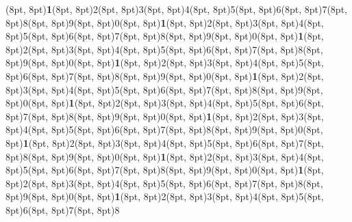 \documentclass[10,a4paper]{article}
\newcommand{\highlight}[1]{{\color{red}\textbf{1}}}
\begin{document}
{{\begin{minipage}{12in}
\vspace{0.7\baselineskip}

\fontsize{8}{8}\selectfont

\framebox(8pt, 8pt){\highlight{1}}\framebox(8pt,
8pt){2}\framebox(8pt, 8pt){3}\framebox(8pt,
8pt){4}\framebox(8pt, 8pt){5}\framebox(8pt,
8pt){6}\framebox(8pt, 8pt){7}\framebox(8pt,
8pt){8}\framebox(8pt, 8pt){9}\noindent\framebox(8pt, 8pt){0}\framebox(8pt, 8pt){\highlight{1}}\framebox(8pt,
8pt){2}\framebox(8pt, 8pt){3}\framebox(8pt,
8pt){4}\framebox(8pt, 8pt){5}\framebox(8pt,
8pt){6}\framebox(8pt, 8pt){7}\framebox(8pt,
8pt){8}\framebox(8pt, 8pt){9}\noindent\framebox(8pt, 8pt){0}\framebox(8pt, 8pt){\highlight{1}}\framebox(8pt,
8pt){2}\framebox(8pt, 8pt){3}\framebox(8pt,
8pt){4}\framebox(8pt, 8pt){5}\framebox(8pt,
8pt){6}\framebox(8pt, 8pt){7}\framebox(8pt,
8pt){8}\framebox(8pt, 8pt){9}\noindent\framebox(8pt, 8pt){0}\framebox(8pt, 8pt){\highlight{1}}\framebox(8pt,
8pt){2}\framebox(8pt, 8pt){3}\framebox(8pt,
8pt){4}\framebox(8pt, 8pt){5}\framebox(8pt,
8pt){6}\framebox(8pt, 8pt){7}\framebox(8pt,
8pt){8}\framebox(8pt, 8pt){9}\framebox(8pt, 8pt){0}\framebox(8pt, 8pt){\highlight{1}}\framebox(8pt,
8pt){2}\framebox(8pt, 8pt){3}\framebox(8pt,
8pt){4}\framebox(8pt, 8pt){5}\framebox(8pt,
8pt){6}\framebox(8pt, 8pt){7}\framebox(8pt,
8pt){8}\framebox(8pt, 8pt){9}\framebox(8pt, 8pt){0}\framebox(8pt, 8pt){\highlight{1}}\framebox(8pt,
8pt){2}\framebox(8pt, 8pt){3}\framebox(8pt,
8pt){4}\framebox(8pt, 8pt){5}\framebox(8pt,
8pt){6}\framebox(8pt, 8pt){7}\framebox(8pt,
8pt){8}\framebox(8pt, 8pt){9}\noindent\framebox(8pt, 8pt){0}\framebox(8pt, 8pt){\highlight{1}}\framebox(8pt,
8pt){2}\framebox(8pt, 8pt){3}\framebox(8pt,
8pt){4}\framebox(8pt, 8pt){5}\framebox(8pt,
8pt){6}\framebox(8pt, 8pt){7}\framebox(8pt,
8pt){8}\framebox(8pt, 8pt){9}\noindent\framebox(8pt, 8pt){0}\framebox(8pt, 8pt){\highlight{1}}\framebox(8pt,
8pt){2}\framebox(8pt, 8pt){3}\framebox(8pt,
8pt){4}\framebox(8pt, 8pt){5}\framebox(8pt,
8pt){6}\framebox(8pt, 8pt){7}\framebox(8pt,
8pt){8}\framebox(8pt, 8pt){9}\noindent\framebox(8pt, 8pt){0}\framebox(8pt, 8pt){\highlight{1}}\framebox(8pt,
8pt){2}\framebox(8pt, 8pt){3}\framebox(8pt,
8pt){4}\framebox(8pt, 8pt){5}\framebox(8pt,
8pt){6}\framebox(8pt, 8pt){7}\framebox(8pt,
8pt){8}\framebox(8pt, 8pt){9}\framebox(8pt, 8pt){0}\framebox(8pt, 8pt){\highlight{1}}\framebox(8pt,
8pt){2}\framebox(8pt, 8pt){3}\framebox(8pt,
8pt){4}\framebox(8pt, 8pt){5}\framebox(8pt,
8pt){6}\framebox(8pt, 8pt){7}\framebox(8pt,
8pt){8}\framebox(8pt, 8pt){9}\framebox(8pt, 8pt){0}\framebox(8pt, 8pt){\highlight{1}}\framebox(8pt,
8pt){2}\framebox(8pt, 8pt){3}\framebox(8pt,
8pt){4}\framebox(8pt, 8pt){5}\framebox(8pt,
8pt){6}\framebox(8pt, 8pt){7}\framebox(8pt,
8pt){8}

\end{minipage}}}
\end{document}
